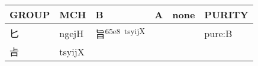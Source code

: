 \documentclass[14pt,a4paper]{scrartcl}
\begin{document}
\begin{longtable}[c]{@{}llllll@{}}
\toprule
\begin{minipage}[b]{0.14\columnwidth}\raggedright\strut
GROUP
\strut\end{minipage} &
\begin{minipage}[b]{0.14\columnwidth}\raggedright\strut
MCH
\strut\end{minipage} &
\begin{minipage}[b]{0.14\columnwidth}\raggedright\strut
B
\strut\end{minipage} &
\begin{minipage}[b]{0.14\columnwidth}\raggedright\strut
A
\strut\end{minipage} &
\begin{minipage}[b]{0.14\columnwidth}\raggedright\strut
none
\strut\end{minipage} &
\begin{minipage}[b]{0.14\columnwidth}\raggedright\strut
PURITY
\strut\end{minipage}\tabularnewline
\midrule
\endhead
\begin{minipage}[t]{0.14\columnwidth}\raggedright\strut
匕
\strut\end{minipage} &
\begin{minipage}[t]{0.14\columnwidth}\raggedright\strut
ngejH
\strut\end{minipage} &
\begin{minipage}[t]{0.14\columnwidth}\raggedright\strut
旨\textsuperscript{65e8~tsyijX}
\strut\end{minipage} &
\begin{minipage}[t]{0.14\columnwidth}\raggedright\strut
\strut\end{minipage} &
\begin{minipage}[t]{0.14\columnwidth}\raggedright\strut
\strut\end{minipage} &
\begin{minipage}[t]{0.14\columnwidth}\raggedright\strut
pure:B
\strut\end{minipage}\tabularnewline
\begin{minipage}[t]{0.14\columnwidth}\raggedright\strut
㫖
\strut\end{minipage} &
\begin{minipage}[t]{0.14\columnwidth}\raggedright\strut
tsyijX
\strut\end{minipage} &
\begin{minipage}[t]{0.14\columnwidth}\raggedright\strut
\strut\end{minipage} &
\begin{minipage}[t]{0.14\columnwidth}\raggedright\strut

\end{minipage}
\end{longtable}
\end{document}
